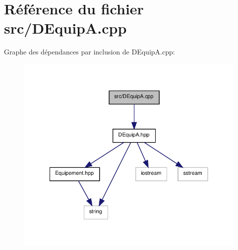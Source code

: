 \section{Référence du fichier src/\-D\-Equip\-A.cpp}
\label{_d_equip_a_8cpp}
Graphe des dépendances par inclusion de D\-Equip\-A.\-cpp\-:\nopagebreak
\begin{figure}[H]
\begin{center}
\leavevmode
\includegraphics[width=318pt]{_d_equip_a_8cpp__incl}
\end{center}
\end{figure}
